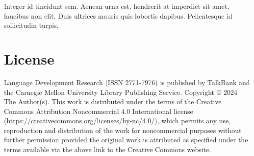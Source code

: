 \documentclass{ldr-article}
\begin{document}
Integer id tincidunt sem. Aenean urna est, hendrerit at imperdiet sit amet, faucibus non elit. Duis ultrices mauris quis lobortis dapibus. Pellentesque id sollicitudin turpis.



\section{License}
Language Development Research (ISSN 2771-7976) is published by TalkBank and the Carnegie Mellon University Library Publishing Service. Copyright © 2024 The Author(s). This work is distributed under the terms of the Creative Commons Attribution Noncommercial 4.0 International license (\url{https://creativecommons.org/licenses/by-nc/4.0/}), which permits any use, reproduction and distribution of the work for noncommercial purposes without further permission provided the original work is attributed as specified under the terms available via the above link to the Creative Commons website.

 
\end{document}
